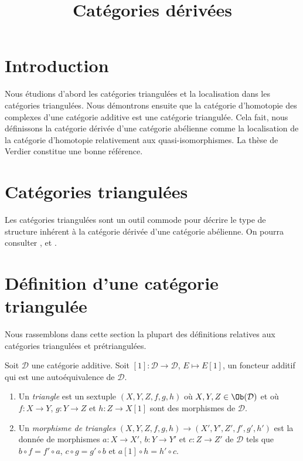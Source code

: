 

%


\title{Catégories dérivées}


\maketitle

\label{section-phantom}

\tableofcontents

\section{Introduction}
\label{section-introduction}

\noindent
Nous étudions d'abord les catégories triangulées et la localisation dans les
catégories triangulées. Nous démontrons ensuite que la catégorie d'homotopie
des complexes d'une catégorie additive est une catégorie triangulée. Cela fait,
nous définissons la catégorie dérivée d'une catégorie abélienne comme la
localisation de la catégorie d'homotopie relativement aux quasi-isomorphismes.
La thèse de Verdier \cite{Verdier} constitue une bonne référence.



\section{Catégories triangulées}
\label{section-triangulated-categories}

\noindent
Les catégories triangulées sont un outil commode pour décrire le type de
structure inhérent à la catégorie dérivée d'une catégorie abélienne. On pourra
consulter \cite{Verdier}, \cite{KS} et \cite{Neeman}.




\section{Définition d'une catégorie triangulée}
\label{section-triangulated-definitions}

\noindent
Nous rassemblons dans cette section la plupart des définitions relatives aux
catégories triangulées et prétriangulées.

\begin{definition}
\label{definition-triangle}
Soit $\mathcal{D}$ une catégorie additive. Soit
$[1] : \mathcal{D} \to \mathcal{D}$, $E \mapsto E[1]$,
un foncteur additif qui est une autoéquivalence de $\mathcal{D}$.
\begin{enumerate}
\item Un {\it triangle} est un sextuple
$(X, Y, Z, f, g, h)$ où $X, Y, Z \in \Ob(\mathcal{D})$ et où
$f : X \to Y$, $g : Y \to Z$ et $h : Z \to X[1]$ sont des morphismes
de $\mathcal{D}$.
\item Un {\it morphisme de triangles}
$(X, Y, Z, f, g, h) \to (X', Y', Z', f', g', h')$
est la donnée de morphismes $a : X \to X'$, $b : Y \to Y'$ et $c : Z \to Z'$
de $\mathcal{D}$ tels que
$b \circ f = f' \circ a$, $c  \circ g = g' \circ b$ et
$a[1] \circ h = h' \circ c$.
\end{enumerate}
\end{definition}

